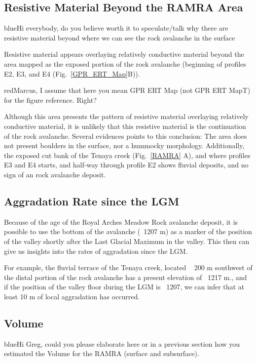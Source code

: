 \documentclass[5p]{elsarticle}
\newcommand{\COMON}{\begin{color}{blue}}
\newcommand{\COMOFF}{\end{color}}
\newcommand{\alon}{\begin{color}{red}}
\newcommand{\aloff}{\end{color}}
\begin{document}
\subsection{Resistive Material Beyond the RAMRA Area}

\COMON Hi everybody, do you believe worth it to speculate/talk why there are resistive material beyond where we can see the rock avalanche in the surface \COMOFF

Resistive material appears overlaying relatively conductive material
beyond the area mapped as the exposed portion of the rock avalanche
(beginning of profiles E2, E3, and E4
(Fig.~\ref{GPR_ERT_Map}B)). \alon Marcus, I assume that here you mean
GPR ERT Map (not GPR ERT MapT) for the figure reference. Right? \aloff 

Although this area presents the pattern of resistive material overlaying relatively conductive material, it is unlikely that this resistive material is the continuation of the rock avalanche. Several evidences points to this conclusion: The area does not present boulders in the surface, nor a hummocky morphology. Additionally, the exposed cut bank of the Tenaya creek (Fig.~\ref{RAMRA} A), and where profiles E3 and E4 starts, and half-way through profile E2 shows fluvial deposits, and no sign of an rock avalanche deposit.  


\subsection{Aggradation Rate since the LGM}

Because of the age of the Royal Arches Meadow Rock avalanche deposit, it is possible to use the bottom of the avalanche (~1207 m) as a marker of the position of the valley shortly after the Last Glacial Maximum in the valley. This then can give us insights into the rates of aggradation since the LGM. 

For example, the fluvial terrace of the Tenaya creek, located ~ 200 m southwest of the distal portion of the rock avalanche has a present elevation of ~1217 m., and if the position of the valley floor during the LGM is ~1207, we can infer that at least 10 m of local aggradation has occurred. 


\subsection{Volume}

\COMON Hi Greg, could you please elaborate here or in a previous section how you estimated the Volume for the RAMRA (surface and subsurface).
\COMOFF
\end{document}
